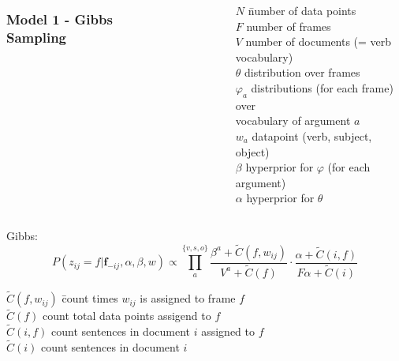 \documentclass{beamer}
\begin{document}
\begin{frame}
  \begin{columns}
  \frametitle{Model 1 - Gibbs Sampling}
  \begin{figure}
  
  \end{figure}
  \begin{scriptsize}
  \begin{tabbing}
    $N$ \hspace{10pt}\= number of data points\\
    $F$              \> number of frames\\
    $V$              \> number of documents (= verb vocabulary)\\
    $\theta$         \> distribution over frames\\
    $\varphi_a$      \> distributions (for each frame) over \\ 
                     \> vocabulary of argument $a$\\
    $w_a$            \> datapoint (verb, subject, object)\\
    $\beta$          \> hyperprior for $\varphi$ (for each argument)\\
    $\alpha$         \> hyperprior for $\theta$ \\
  \end{tabbing}
  \end{scriptsize}
  \end{columns}
\footnotesize{Gibbs:}
\[
P(z_{ij} = f| \mathbf{f}_{-ij},\alpha,\beta,w)
\propto \prod_a^{\{v,s,o\}}\frac{\beta^a + \tilde{C}(f,w_{ij})}{V^a + \tilde{C}(f)}
        \cdot \frac{\alpha + \tilde{C}(i,f)}{F\alpha+\tilde{C}(i)}
\]
\begin{scriptsize}
  \begin{tabbing}
    $\tilde{C}(f,w_{ij})$ \hspace{10pt}\= count times $w_{ij}$ is assigned to frame $f$\\
    $\tilde{C}(f)$                     \> count total data points assigend to $f$\\
    $\tilde{C}(i,f)$                   \> count sentences in document $i$ assigned to $f$\\
    $\tilde{C}(i)$                     \> count sentences in document $i$\\ 
  \end{tabbing}
  \end{scriptsize}

\end{frame}
\end{document}
